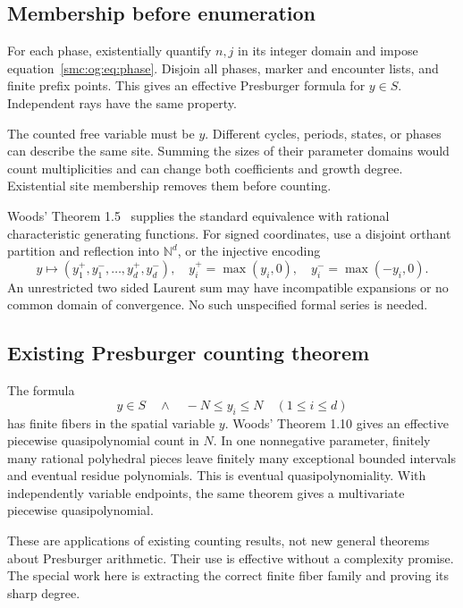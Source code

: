 \documentclass[11pt,letterpaper]{article}
\numberwithin{equation}{section}
\theoremstyle{definition}
\theoremstyle{remark}
\newcommand{\NN}{\mathbb N}
\begin{document}
\subsection{Membership before enumeration}
For each phase, existentially quantify $n,j$ in its integer domain and impose equation~\eqref{smc:og:eq:phase}. Disjoin all phases, marker and encounter lists, and finite prefix points. This gives an effective Presburger formula for $y\in S$. Independent rays have the same property.

The counted free variable must be $y$. Different cycles, periods, states, or phases can describe the same site. Summing the sizes of their parameter domains would count multiplicities and can change both coefficients and growth degree. Existential site membership removes them before counting.

Woods' Theorem 1.5~\cite{woods2015} supplies the standard equivalence with rational characteristic generating functions. For signed coordinates, use a disjoint orthant partition and reflection into $\NN^d$, or the injective encoding
\[
 y\longmapsto(y_1^+,y_1^-,\ldots,y_d^+,y_d^-),
 \quad y_i^+=\max(y_i,0),\quad y_i^-=\max(-y_i,0).
\]
An unrestricted two sided Laurent sum may have incompatible expansions or no common domain of convergence. No such unspecified formal series is needed.

\subsection{Existing Presburger counting theorem}
The formula
\[
 y\in S\quad\wedge\quad -N\le y_i\le N\quad(1\le i\le d)
\]
has finite fibers in the spatial variable $y$. Woods' Theorem 1.10 gives an effective piecewise quasipolynomial count in $N$. In one nonnegative parameter, finitely many rational polyhedral pieces leave finitely many exceptional bounded intervals and eventual residue polynomials. This is eventual quasipolynomiality. With independently variable endpoints, the same theorem gives a multivariate piecewise quasipolynomial.

These are applications of existing counting results, not new general theorems about Presburger arithmetic. Their use is effective without a complexity promise. The special work here is extracting the correct finite fiber family and proving its sharp degree.
\end{document}
